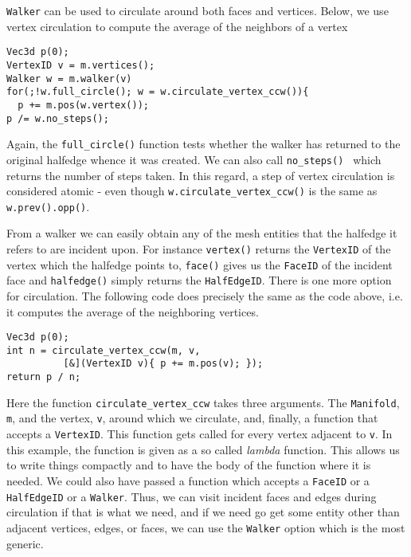 \documentclass[a4paper]{article}
\begin{document}
\texttt{Walker} can be used to circulate around both faces and vertices. Below, we use vertex circulation to compute the average of the neighbors of a vertex
\begin{verbatim}
Vec3d p(0);
VertexID v = m.vertices();
Walker w = m.walker(v)
for(;!w.full_circle(); w = w.circulate_vertex_ccw()){
  p += m.pos(w.vertex()); 
p /= w.no_steps();
\end{verbatim}

Again, the \texttt{full\_circle()} function tests whether the walker has returned to the original halfedge whence it was created. We can also call  \texttt{no\_steps() } which returns the number of steps taken. In this regard, a step of vertex circulation is considered atomic - even though \texttt{w.circulate\_vertex\_ccw()} is the same as  \texttt{w.prev().opp()}.

From a walker we can easily obtain any of the mesh entities that the halfedge it refers to are incident upon. For instance \texttt{vertex()} returns the \texttt{VertexID} of the vertex which the halfedge points to, \texttt{face()} gives us the \texttt{FaceID} of the incident face and \texttt{halfedge()} simply returns the \texttt{HalfEdgeID}. There is one more option for circulation. The following code does precisely the same as the code above, i.e. it computes the average of the neighboring vertices.
\begin{verbatim}
Vec3d p(0);
int n = circulate_vertex_ccw(m, v, 
          [&](VertexID v){ p += m.pos(v); });
return p / n;
\end{verbatim}
Here the function \texttt{circulate\_vertex\_ccw} takes three arguments. The \texttt{Manifold}, \texttt{m}, and the vertex, \texttt{v}, around which we circulate, and, finally, a function that accepts a \texttt{VertexID}. This function gets called for every vertex adjacent to \texttt{v}. In this example, the function is given as a so called \textit{lambda} function. This allows us to write things compactly and to have the body of the function where it is needed. We could also have passed a function which accepts a \texttt{FaceID} or a \texttt{HalfEdgeID} or a \texttt{Walker}. Thus, we can visit incident faces and edges during circulation if that is what we need, and if we need go get some entity other than adjacent vertices, edges, or faces, we can use the \texttt{Walker} option which is the most generic.
\end{document}

